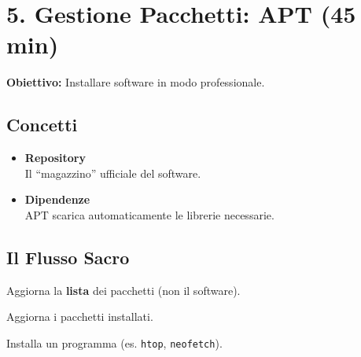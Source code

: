 \documentclass[11pt,a4paper]{article}
\begin{document}
\section{5. Gestione Pacchetti: APT (45
min)}\label{gestione-pacchetti-apt-45-min}

\textbf{Obiettivo:} Installare software in modo professionale.

\subsection{Concetti}\label{concetti-1}

\begin{itemize}
\item
  \textbf{Repository}\\
  Il ``magazzino'' ufficiale del software.
\item
  \textbf{Dipendenze}\\
  APT scarica automaticamente le librerie necessarie.
\end{itemize}

\subsection{Il Flusso Sacro}\label{il-flusso-sacro}

\begin{Shaded}
\begin{Highlighting}[]
\end{Highlighting}
\end{Shaded}

Aggiorna la \textbf{lista} dei pacchetti (non il software).

\begin{Shaded}
\begin{Highlighting}[]
\end{Highlighting}
\end{Shaded}

Aggiorna i pacchetti installati.

\begin{Shaded}
\begin{Highlighting}[]
\end{Highlighting}
\end{Shaded}

Installa un programma (es. \texttt{htop}, \texttt{neofetch}).

\begin{Shaded}
\begin{Highlighting}[]
\end{Highlighting}
\end{Shaded}
\end{document}
